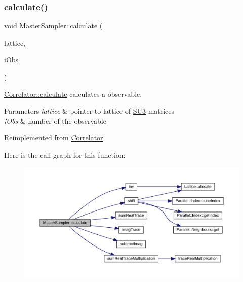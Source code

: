 \subsubsection{\texorpdfstring{calculate()}{calculate()}}
{\footnotesize\ttfamily void Master\+Sampler\+::calculate (\begin{DoxyParamCaption}\item[{\mbox{\hyperlink{class_lattice}{Lattice}}$<$ \mbox{\hyperlink{class_s_u3}{S\+U3}} $>$ $\ast$}]{lattice,  }\item[{unsigned int}]{i\+Obs }\end{DoxyParamCaption})\hspace{0.3cm}{\ttfamily [virtual]}}



\mbox{\hyperlink{class_correlator_ab33502ff305f891c5c2e6d66a26a0247}{Correlator\+::calculate}} calculates a observable. 


\begin{DoxyParams}{Parameters}
{\em lattice} & pointer to lattice of \mbox{\hyperlink{class_s_u3}{S\+U3}} matrices \\
\hline
{\em i\+Obs} & number of the observable \\
\hline
\end{DoxyParams}


Reimplemented from \mbox{\hyperlink{class_correlator_ab33502ff305f891c5c2e6d66a26a0247}{Correlator}}.

Here is the call graph for this function\+:
\nopagebreak
\begin{figure}[H]
\begin{center}
\leavevmode
\includegraphics[width=350pt]{class_master_sampler_ad3cc7e36498dbf4a39238de3ac59ae8b_cgraph}
\end{center}
\end{figure}
\mbox{\label{class_master_sampler_a893be9ba7dca98cb8d9d3cb30e42fcc3}} 
